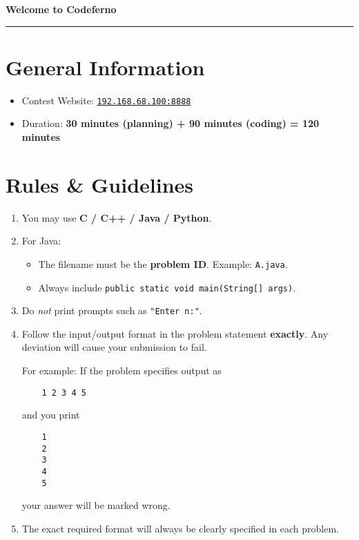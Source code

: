\documentclass[12pt,a4paper]{article}
\begin{document}
\ifdefined\BOOKLET
  \pagestyle{empty}
\fi

\begin{center}
    {\LARGE \textbf{Welcome to Codeferno}} \\[0.5em]
    \rule{\textwidth}{0.4pt}
\end{center}

\vspace{1em}

\section*{General Information}
\begin{itemize}[leftmargin=1.5em]
    \item Contest Website: \href{http://192.168.68.100:8888}{\texttt{192.168.68.100:8888}}
\item Duration: \textbf{30 minutes (planning) + 90 minutes (coding) = 120 minutes}
\end{itemize}

\section*{Rules \& Guidelines}
\begin{enumerate}[leftmargin=1.5em]
    \item You may use \textbf{C / C++ / Java / Python}.
    \item For Java: 
    \begin{itemize}
        \item The filename must be the \textbf{problem ID}. Example: \texttt{A.java}.
        \item Always include \texttt{public static void main(String[] args)}.
    \end{itemize}
    \item Do \emph{not} print prompts such as \texttt{"Enter n:"}.
    \item Follow the input/output format in the problem statement \textbf{exactly}.  
    Any deviation will cause your submission to fail.  
    \begin{tcolorbox}[mybox]
    For example: If the problem specifies output as  
    \begin{verbatim}
    1 2 3 4 5
    \end{verbatim}  
    and you print  
    \begin{verbatim}
    1
    2
    3
    4
    5
    \end{verbatim}  
    your answer will be marked wrong.
    \end{tcolorbox}
    \item The exact required format will always be clearly specified in each problem.
\end{enumerate}
\end{document}
